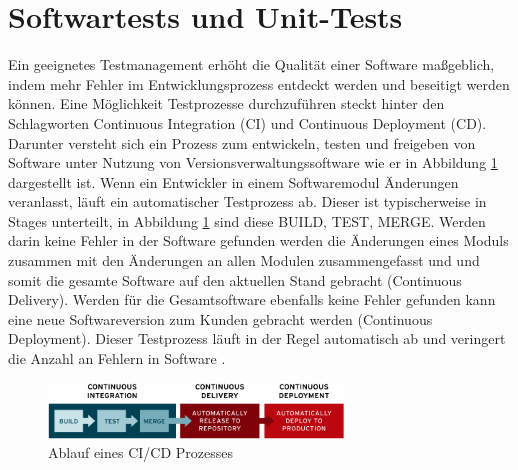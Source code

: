 \section{Softwartests und Unit-Tests} \label{sec:CICD}



Ein geeignetes Testmanagement erhöht die Qualität einer Software maßgeblich, indem mehr Fehler im Entwicklungsprozess entdeckt werden und beseitigt werden können. Eine Möglichkeit Testprozesse durchzuführen steckt hinter den Schlagworten Continuous Integration (CI) und Continuous Deployment (CD). Darunter versteht sich ein Prozess zum entwickeln, testen und freigeben von Software unter Nutzung von Versionsverwaltungssoftware wie er in Abbildung \ref{fig:ci-cd-flow-desktop} dargestellt ist. Wenn ein Entwickler in einem Softwaremodul Änderungen veranlasst, läuft ein automatischer Testprozess ab. Dieser ist typischerweise in Stages unterteilt, in Abbildung \ref{fig:ci-cd-flow-desktop} sind diese BUILD, TEST, MERGE. Werden darin keine Fehler in der Software gefunden werden die Änderungen eines Moduls zusammen mit den Änderungen an allen Modulen zusammengefasst und und somit die gesamte Software auf den aktuellen Stand gebracht (Continuous Delivery). Werden für die Gesamtsoftware ebenfalls keine Fehler gefunden kann eine neue Softwareversion zum Kunden gebracht werden (Continuous Deployment). Dieser Testprozess läuft in der Regel automatisch ab und veringert die Anzahl an Fehlern in Software \cite{redhat2024}.
\begin{figure}
    \centering
    \includegraphics[width=0.7\textwidth]{figures/2_Grundlagen/ci-cd-flow-desktop.png}
    \caption{Ablauf eines CI/CD Prozesses \cite{redhat2024}}
    \label{fig:ci-cd-flow-desktop}
\end{figure}